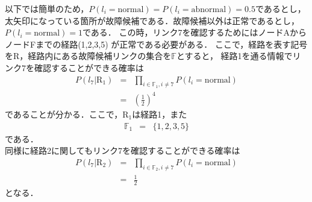 \documentclass[11pt]{article}
\begin{document}
以下では簡単のため，$P(l_i = \text{normal}) = P(l_i = \text{abnormal}) = 0.5$であるとし，
太矢印になっている箇所が故障候補である．故障候補以外は正常であるとし，
$P(l_i = \text{normal}) =1$である．
この時，リンク7を確認するためにはノードAからノードFまでの経路(1,2,3,5)
が正常である必要がある．%
ここで，経路を表す記号をR，経路内にある故障候補リンクの集合を$\mathbb{F}$とすると，
経路1を通る情報でリンク$7$を確認することができる確率は
\begin{eqnarray}
   P(l_{7} | \text{R}_1) &=& \prod_{i\in\mathbb{F}_1,i\neq 7} P(l_{i} = \text{normal})\\
     &=& \left( \frac{1}{2}\right)^4
\end{eqnarray}
であることが分かる．ここで，R$_1$は経路1，また
\begin{eqnarray}
   \mathbb{F}_1  &=& \{ 1,2,3,5\} 
\end{eqnarray}
である．\\
同様に経路2に関してもリンク$7$を確認することができる確率は
\begin{eqnarray}
   P(l_{7} | \text{R}_2)  &=& \prod_{i\in\mathbb{F}_2,i\neq 7} P(l_{i} = \text{normal})\\
   &=& \frac{1}{2}
\end{eqnarray}
となる．
\end{document}
